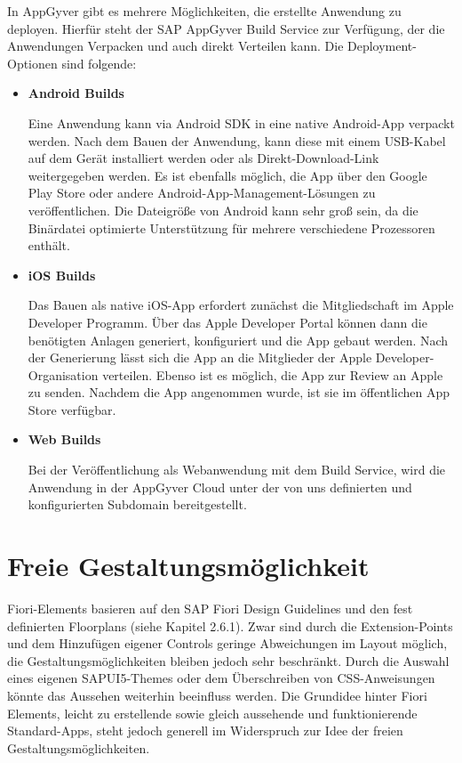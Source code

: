 In AppGyver gibt es mehrere Möglichkeiten, die erstellte Anwendung zu deployen. Hierfür steht der SAP AppGyver Build Service zur Verfügung, der die Anwendungen Verpacken und auch direkt Verteilen kann. Die Deployment-Optionen sind folgende:

\begin{itemize}[noitemsep]
\item \textbf{Android Builds} 

Eine Anwendung kann via Android SDK in eine native Android-App verpackt werden. Nach dem Bauen der Anwendung, kann diese mit einem USB-Kabel auf dem Gerät installiert werden oder als Direkt-Download-Link weitergegeben werden.  Es ist ebenfalls möglich, die App über den Google Play Store oder andere Android-App-Management-Lösungen zu veröffentlichen. Die Dateigröße von Android kann sehr groß sein, da die Binärdatei optimierte Unterstützung für mehrere verschiedene Prozessoren enthält\cite{app:bu}. 
\item \textbf{iOS Builds} 

Das Bauen als native iOS-App erfordert zunächst die Mitgliedschaft im Apple Developer Programm. Über das Apple Developer Portal können dann die benötigten Anlagen generiert, konfiguriert und die App gebaut werden. Nach der Generierung lässt sich die App an die Mitglieder der Apple Developer-Organisation verteilen. Ebenso ist es möglich, die App zur Review an Apple zu senden. Nachdem die App angenommen wurde, ist sie im öffentlichen App Store verfügbar\cite{app:ios}. 
\item \textbf{Web Builds} 

Bei der Veröffentlichung als Webanwendung mit dem Build Service, wird die Anwendung in der AppGyver Cloud unter der von uns definierten und konfigurierten Subdomain bereitgestellt.
\end{itemize}

\section{Freie Gestaltungsmöglichkeit}

Fiori-Elements basieren auf den SAP Fiori Design Guidelines und den fest definierten Floorplans (siehe Kapitel 2.6.1). Zwar sind durch die Extension-Points und dem Hinzufügen eigener Controls geringe Abweichungen im Layout möglich, die Gestaltungsmöglichkeiten bleiben jedoch sehr beschränkt. Durch die Auswahl eines eigenen SAPUI5-Themes oder dem Überschreiben von CSS-Anweisungen könnte das Aussehen weiterhin beeinfluss werden. Die Grundidee hinter Fiori Elements, leicht zu erstellende sowie gleich aussehende und funktionierende Standard-Apps, steht jedoch generell im Widerspruch zur Idee der freien Gestaltungsmöglichkeiten.

